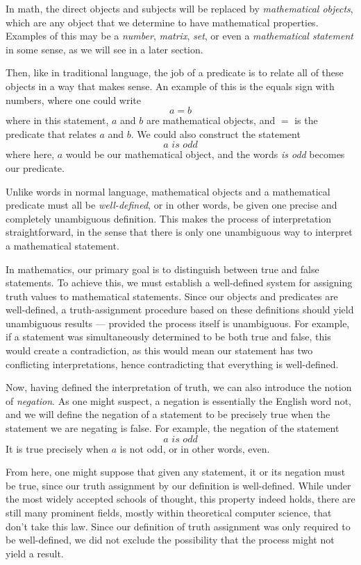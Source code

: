 In math, the direct objects and subjects will be replaced by \textit{mathematical objects}, which are any object that we determine to have mathematical properties.
Examples of this may be a \textit{number}, \textit{matrix}, \textit{set}, or even a \textit{mathematical statement} in some sense, as we will see in a later section.

Then, like in traditional language, the job of a predicate is to relate all of these objects in a way that makes sense.
An example of this is the equals sign with numbers, where one could write
$$a=b$$
where in this statement, $a$ and $b$ are mathematical objects, and $=$ is the predicate that relates $a$ and $b$.
We could also construct the statement
$$a \textit{ is odd}$$
where here, $a$ would be our mathematical object, and the words \textit{is odd} becomes our predicate.

Unlike words in normal language, mathematical objects and a mathematical predicate must all be \textit{well-defined}, or in other words, be given one precise and completely unambiguous definition.
This makes the process of interpretation straightforward, in the sense that there is only one unambiguous way to interpret a mathematical statement.

In mathematics, our primary goal is to distinguish between true and false statements. To achieve this, we must establish a well-defined system for assigning truth values to mathematical statements.
Since our objects and predicates are well-defined, a truth-assignment procedure based on these definitions should yield unambiguous results --- provided the process itself is unambiguous.
For example, if a statement was simultaneously determined to be both true and false, this would create a contradiction, as this would mean our statement has two conflicting interpretations, hence contradicting that everything is well-defined.

Now, having defined the interpretation of truth, we can also introduce the notion of \textit{negation}.
As one might suspect, a negation is essentially the English word not, and we will define the negation of a statement to be precisely true when the statement we are negating is false.
For example, the negation of the statement
$$a \textit{ is odd}$$
It is true precisely when $a$ is not odd, or in other words, even.

From here, one might suppose that given any statement, it or its negation must be true, since our truth assignment by our definition is well-defined.
While under the most widely accepted schools of thought, this property indeed holds, there are still many prominent fields, mostly within theoretical computer science, that don't take this law.
Since our definition of truth assignment was only required to be well-defined, we did not exclude the possibility that the process might not yield a result.

